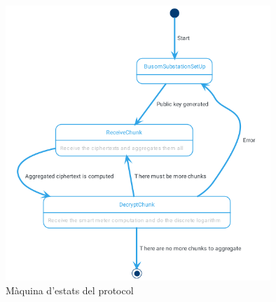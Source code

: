 \begin{figure}[H]
	\centering
	\includegraphics[width=10cm]{classes/busomstatesub.png}
	\caption{Màquina d'estats del protocol \cite{busom}}
	\label{fig:busom-state-sub}
\end{figure}

